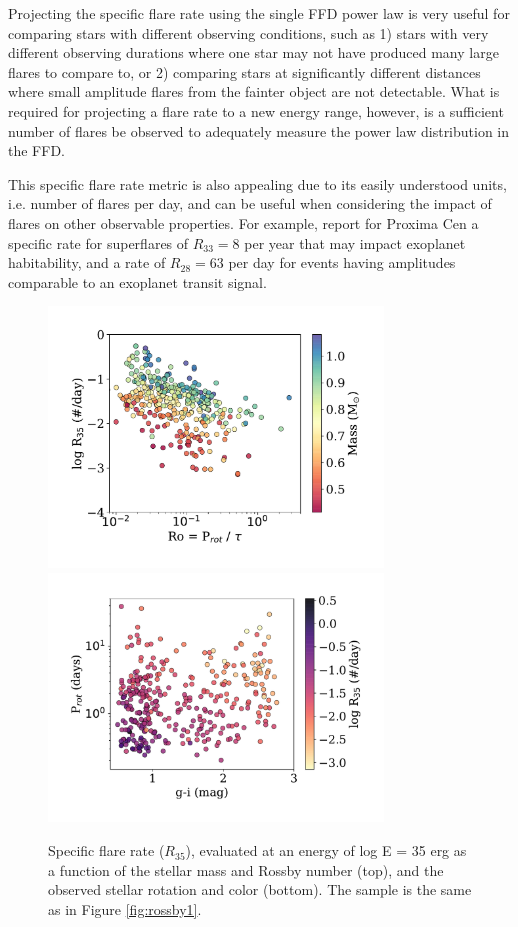 \documentclass[preprint2]{aastex62}
\begin{document}
Projecting the specific flare rate using the single FFD power law is very useful for comparing stars with different observing conditions, such as 1) stars with very different observing durations where one star may not have produced many large flares to compare to, or 2) comparing stars at significantly different distances where small amplitude flares from the fainter object are not detectable. What is required for projecting a flare rate to a new energy range, however, is a sufficient number of flares be observed to adequately measure the power law distribution in the FFD.

This specific flare rate metric is also appealing due to its easily understood units, i.e. number of flares per day, and can be useful when considering the impact of flares on other observable properties. For example, \citet{davenport2016b} report for Proxima Cen a specific rate for superflares of $R_{33}=8$ per year that may impact exoplanet habitability, and a rate of $R_{28}=63$ per day for events having amplitudes comparable to an exoplanet transit signal.



\begin{figure}[!t]
\centering
\includegraphics[width=3.5in]{fig5a}
\includegraphics[width=3.5in]{fig5b}
\caption{
Specific flare rate ($R_{35}$), evaluated at an energy of log E = 35 erg as a function of the stellar mass and Rossby number (top), and the observed stellar rotation and color (bottom). The sample is the same as in Figure \ref{fig:rossby1}.
}
\label{fig:rossby2}
\end{figure}
\end{document}
